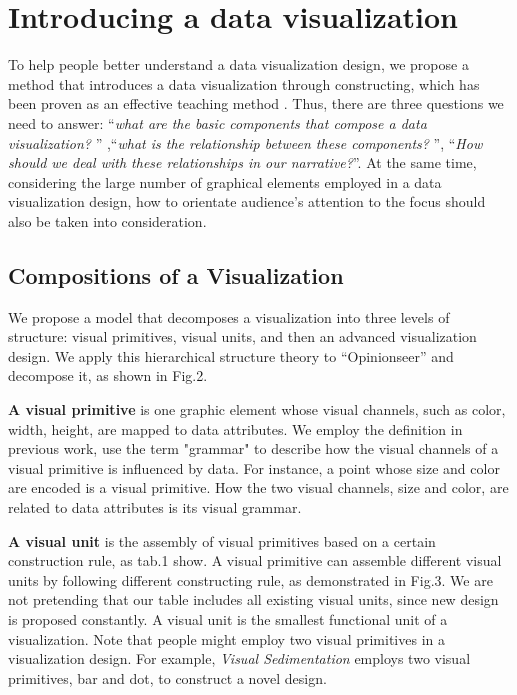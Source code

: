 \section{Introducing a data visualization} 
To help people better understand a data visualization design, we propose a method that introduces a data visualization through constructing, which has been proven as an effective teaching method\cite{huron_constructive_2014, chapman_constructive_1988} . Thus, there are three questions we need to answer: ``\textit{what are the basic components that compose a data visualization? }'' ,``\textit{what is the relationship between these components? }'', ``\textit{How should we deal with these relationships in our narrative?}''. At the same time, considering the large number of graphical elements employed in a data visualization design, how to orientate audience's attention to the focus should also be taken into consideration.

\subsection{Compositions of a Visualization}
We propose a model that decomposes a visualization into three levels of structure: visual primitives, visual units, and then an advanced visualization design. We apply this hierarchical structure theory to ``Opinionseer'' and decompose it, as shown in Fig.2. 

\textbf{A visual primitive} is one graphic element whose visual channels, such as color, width, height, are mapped to data attributes. We employ the definition in previous work\cite{huron_constructive_2014, satyanarayan_vega-lite:_2017}, use the term "grammar" to describe how the visual channels of a visual primitive is influenced by data. For instance, a point whose size and color are encoded is a visual primitive. How the two visual channels, size and color, are related to data attributes is its visual grammar. 

\textbf{A visual unit} is the assembly of visual primitives based on a certain construction rule, as tab.1 show. 
A visual primitive can assemble different visual units by following different constructing rule, as demonstrated in Fig.3. We are not pretending that our table includes all existing visual units, since new design is proposed constantly. A visual unit is the smallest functional unit of a visualization. Note that people might employ two visual primitives in a visualization design. For example, \textit{Visual Sedimentation}\cite{huron_visual_2013} employs two visual primitives, bar and dot, to construct a novel design. 


